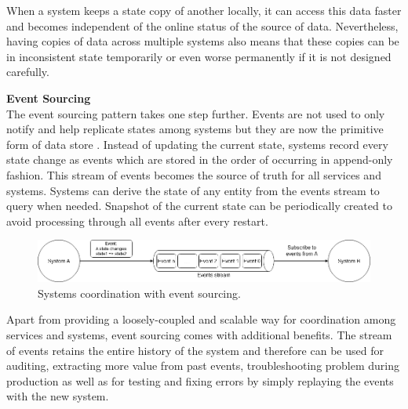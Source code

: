 When a system keeps a state copy of another locally, it can access this data faster and becomes independent of the online status of the source of data. Nevertheless, having copies of data across multiple systems also means that these copies can be in inconsistent state temporarily or even worse permanently if it is not designed carefully. 

\textbf{Event Sourcing}\\
The event sourcing pattern takes one step further. Events are not used to only notify and help replicate states among systems but they are now the primitive form of data store \cite{eventsourcingfowler}. Instead of updating the current state, systems record every state change as events which are stored in the order of occurring in append-only fashion. This stream of events becomes the source of truth for all services and systems. Systems can derive the state of any entity from the events stream to query when needed. Snapshot of the current state can be periodically created to avoid processing through all events after every restart.

\begin{figure}[h]
	\includegraphics[width=\linewidth]{images/eventsourcing.png}
	\caption{Systems coordination with event sourcing.}
	\label{fig:eventsourcing}
\end{figure}

Apart from providing a loosely-coupled and scalable way for coordination among services and systems, event sourcing comes with additional benefits. The stream of events retains the entire history of the system and therefore can be used for auditing, extracting more value from past events, troubleshooting problem during production as well as for testing and fixing errors by simply replaying the events with the new system.



